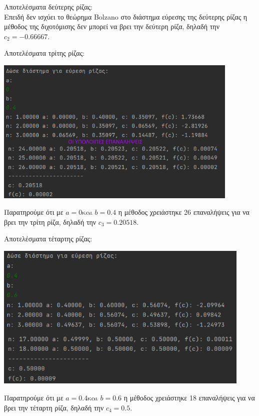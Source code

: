 \documentclass{article}
\begin{document}
    \vspace{3mm}
    Αποτελέσματα δεύτερης ρίζας: \\
    Επειδή δεν ισχύει το θεώρημα Bolzano στο διάστημα εύρεσης της δεύτερης ρίζας η μέθοδος της διχοτόμισης δεν μπορεί να βρει την δεύτερη ρίζα, δηλαδή την \(c_2 = -0.66667\).
    
    \pagebreak
    \vspace{3mm}
    Αποτελέσματα τρίτης ρίζας: \\
    \begin{center}\includegraphics[height = 7cm]{images/results_14.png}\end{center}
    Παρατηρούμε ότι με \(a = 0 \text{και } b = 0.4\) η μέθοδος χρειάστηκε 26 επαναλήψεις για να βρει την τρίτη ρίζα, δηλαδή την \(c_3 = 0.20518\). 
    
    \vspace{3mm}
    Αποτελέσματα τέταρτης ρίζας: \\
    \begin{center}\includegraphics[height = 7cm]{images/results_15.png}\end{center}
    Παρατηρούμε ότι με \(a = 0.4 \text{και } b = 0.6\) η μέθοδος χρειάστηκε 18 επαναλήψεις για να βρει την τέταρτη ρίζα, δηλαδή την \(c_4 = 0.5\).
    
\end{document}
